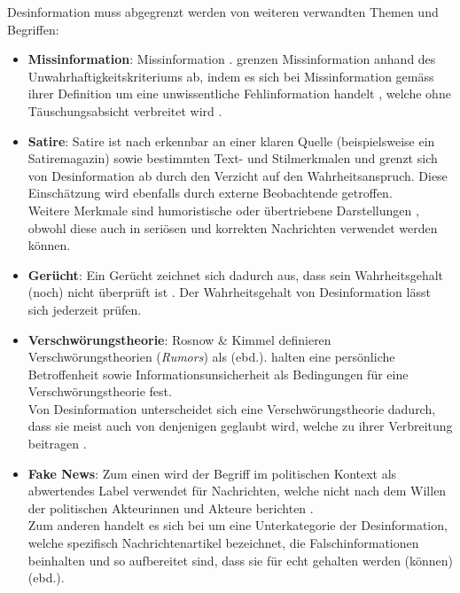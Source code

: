 \documentclass[12pt,a4paper]{article}        %
\begin{document}
\pagebreak
Desinformation muss abgegrenzt werden von weiteren verwandten Themen und Begriffen:
\begin{itemize}
  \item \textbf{Missinformation}: Missinformation  \parencite[2]{bontridder_role_2021}. \citeauthor{marx_fake_2020} grenzen Missinformation anhand des Unwahrhaftigkeitskriteriums ab, indem es sich bei Missinformation gemäss ihrer Definition um eine unwissentliche Fehlinformation handelt \parencite[156]{marx_fake_2020}, welche ohne Täuschungsabsicht verbreitet wird \parencite[vgl.\ auch][15]{grujic_warnhinweise_2024}.
  \item \textbf{Satire}: Satire ist nach \textcite[154]{marx_fake_2020} erkennbar an einer klaren Quelle (beispielsweise ein Satiremagazin) sowie bestimmten Text- und Stilmerkmalen und grenzt sich von Desinformation ab durch den Verzicht auf den Wahrheitsanspruch. Diese Einschätzung wird ebenfalls durch externe Beobachtende getroffen.\\
    Weitere Merkmale sind humoristische oder übertriebene Darstellungen \parencites[141]{tandoc_jr_defining_2018}[2]{khan_fake_2021}, obwohl diese auch in seriösen und korrekten Nachrichten verwendet werden können.
  \item \textbf{Gerücht}: Ein Gerücht zeichnet sich dadurch aus, dass sein Wahrheitsgehalt (noch) nicht überprüft ist \parencite[155]{marx_fake_2020}. Der Wahrheitsgehalt von Desinformation lässt sich jederzeit prüfen.
  \item \textbf{Verschwörungstheorie}: Rosnow \& Kimmel \parencite[zit.\ nach][197]{krafft_disinformation_2020} definieren Verschwörungstheorien (\textit{Rumors}) als  (ebd.). \textcite[197]{krafft_disinformation_2020} halten eine persönliche Betroffenheit sowie Informationsunsicherheit als Bedingungen für eine Verschwörungstheorie fest.\\
    Von Desinformation unterscheidet sich eine Verschwörungstheorie dadurch, dass sie meist auch von denjenigen geglaubt wird, welche zu ihrer Verbreitung beitragen \parencite[156]{marx_fake_2020}.
  \item \textbf{Fake News}: Zum einen wird der Begriff im politischen Kontext als abwertendes Label verwendet für Nachrichten, welche nicht nach dem Willen der politischen Akteurinnen und Akteure berichten \parencite[3]{tandoc_jr_facts_2019}.\\

    \pagebreak
    Zum anderen handelt es sich bei  um eine Unterkategorie der Desinformation, welche spezifisch Nachrichtenartikel bezeichnet, die Falschinformationen beinhalten und so aufbereitet sind, dass sie für echt gehalten werden (können) (ebd.).
\end{itemize}
\end{document}
